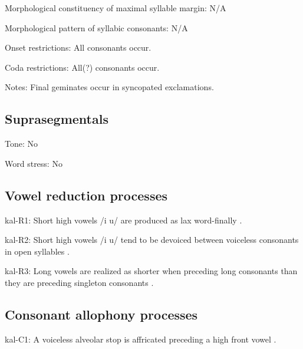 {\begin{appendixdesc}
\item[Morphological constituency of maximal syllable margin:] N/A

\item[Morphological pattern of syllabic consonants:] N/A

\item[Onset restrictions:] All consonants occur.

\item[Coda restrictions:] All(?) consonants occur.

\item[Notes:] Final geminates occur in syncopated exclamations.
\end{appendixdesc}
\subsection*{Suprasegmentals}
\begin{appendixdesc}
\item[Tone:] No

\item[Word stress:] No
\end{appendixdesc}
\subsection*{Vowel reduction processes}
\begin{appendixdesc}

\item[kal-R1:]  Short high vowels /i u/ are produced as lax word-finally \citep[56--63]{Hagerup2011}.

\item[kal-R2:] Short high vowels /i u/ tend to be devoiced between voiceless consonants in open syllables \citep[335]{Fortescue1984}.

\item[kal-R3:] Long vowels are realized as shorter when preceding long consonants than they are preceding singleton consonants \citep[65]{Jacobsen2000}.
\end{appendixdesc}
\subsection*{Consonant allophony processes}
\begin{appendixdesc}

\item[kal-C1:] A voiceless alveolar stop is affricated preceding a high front vowel \citep[333]{Fortescue1984}.


\end{appendixdesc}}
